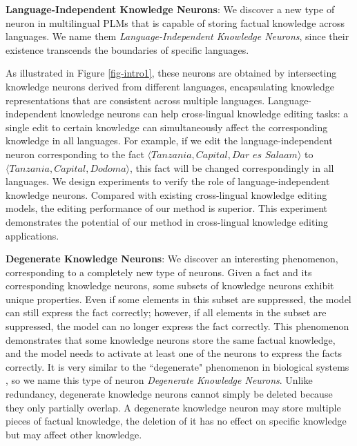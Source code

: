 \documentclass[]{article}
\begin{document}
\textbf{Language-Independent Knowledge Neurons}: We discover a new type of neuron in multilingual PLMs that is capable of storing factual knowledge across languages.
We name them \textit{Language-Independent Knowledge Neurons}, since their existence transcends the boundaries of specific languages.

As illustrated in Figure \ref{fig-intro1}, these neurons are obtained by intersecting knowledge neurons derived from different languages, encapsulating knowledge representations that are consistent across multiple languages. Language-independent knowledge neurons can help cross-lingual knowledge editing tasks: a single edit to certain knowledge can simultaneously affect the corresponding knowledge in all languages. For example, if we edit the language-independent neuron corresponding to the fact $\langle  \textit{Tanzania}, \textit{Capital}, \textit{Dar es Salaam} \rangle$ to $\langle \textit{Tanzania}, \textit{Capital}, \textit{Dodoma} \rangle$, this fact will be changed correspondingly in all languages.
We design experiments to verify the role of language-independent knowledge neurons. Compared with existing cross-lingual knowledge editing models, the editing performance of our method is superior. This experiment demonstrates the potential of our method in cross-lingual knowledge editing applications.

\textbf{Degenerate Knowledge Neurons}: We discover an interesting phenomenon, corresponding to a completely new type of neurons. Given a fact and its corresponding knowledge neurons, some subsets of knowledge neurons exhibit unique properties. Even if some elements in this subset are suppressed, the model can still express the fact correctly; however, if all elements in the subset are suppressed, the model can no longer express the fact correctly. This phenomenon demonstrates that some knowledge neurons store the same factual knowledge, and the model needs to activate at least one of the neurons to express the facts correctly. It is very similar to the ``degenerate" phenomenon in biological systems \cite{degenerate_biological,mason2015degeneracy}, so we name this type of neuron \textit{Degenerate Knowledge Neurons}.
Unlike redundancy, degenerate knowledge neurons cannot simply be deleted because they only partially overlap. A degenerate knowledge neuron may store multiple pieces of factual knowledge, the deletion of it has no effect on specific knowledge but may affect other knowledge.
\end{document}
